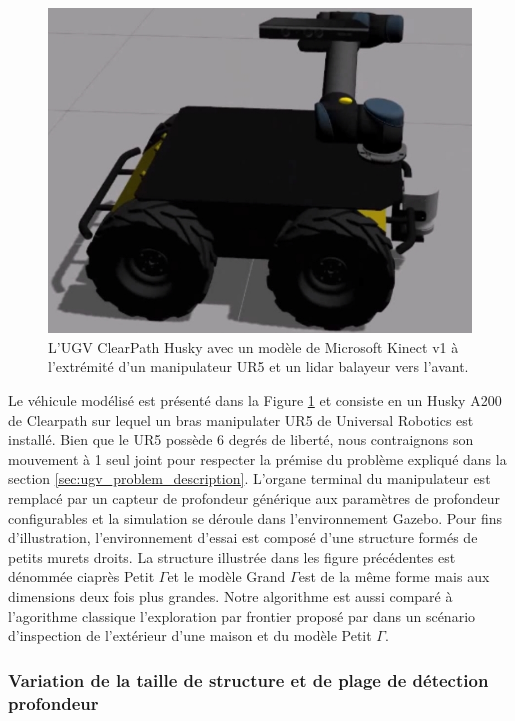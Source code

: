 \begin{figure}[h]
  \centering
  \includegraphics[width=0.5\linewidth]{images/ugv_gazebo_husky.jpg}
  \caption{L'UGV ClearPath Husky avec un modèle de Microsoft Kinect v1 à l'extrémité d'un manipulateur UR5 et un lidar balayeur vers l'avant.}
  \label{fig:ugv_gazebo_husky}
\end{figure}

Le véhicule modélisé est présenté dans la Figure \ref{fig:ugv_gazebo_husky} et consiste en un Husky A200 de Clearpath sur lequel un bras manipulater UR5 de Universal Robotics est installé. Bien que le UR5 possède 6 degrés de liberté, nous contraignons son mouvement à 1 seul joint pour respecter la prémise du problème expliqué dans la section \ref{sec:ugv_problem_description}. L'organe terminal du manipulateur est remplacé par un capteur de profondeur générique aux paramètres de profondeur configurables et la simulation se déroule dans l'environnement Gazebo. Pour fins d'illustration, l'environnement d'essai est composé d'une structure formés de petits murets droits. La structure illustrée dans les figure précédentes est dénommée ciaprès \guillemotleft Petit $\Gamma$\guillemotright et le modèle \guillemotleft Grand $\Gamma$\guillemotright est de la même forme mais aux dimensions deux fois plus grandes. Notre algorithme est aussi comparé à l'agorithme classique l'exploration par frontier proposé par \citep{Yamauchi1997} dans un scénario d'inspection de l'extérieur d'une maison et du modèle Petit $\Gamma$.

\subsubsection{Variation de la taille de structure et de plage de détection profondeur}

